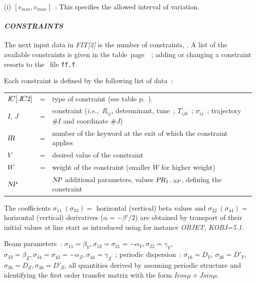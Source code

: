 \smallskip

\noindent (i) $[v_{min}, v_{max}]$~: This specifies the allowed interval of variation. 


\paragraph{\textit{CONSTRAINTS}}  

\noindent The next input data in \textsl{FIT[2]} is the number of constraints, \textsl{\NC}. 
A list of the available constraints is given in the table~page~\pageref{TabFITZlst1}~; adding or changing a constraint 
resorts to the \FORTRAN\ file \texttt{ff.f}. 

\medskip 

Each constraint is defined by the following list of data~: 

\begin{center}
	\begin{tabular}{lcp{15cm}}
	$I\!C[.I\!C 2]$        &  = &  type of  constraint (see table p.~\pageref{TabFITZlst1}).\\
	$I$, $J$    & =  &  constraint (\emph{i.e.},~$R_{ij}$, determinant, tune~; 
	                    $T_{ijk}$~; $\sigma_{ ij}$~; trajectory $\#I$ and coordinate $\#J$)\\
	\label{RefIR}
        $\textsl{IR}$       &  =  &  number of the keyword at the exit of which the constraint applies   \\
	$V$        &  =  &  desired value of the constraint\\
	$W$        &  =  &  weight of the constraint (smaller $W$ for higher weight)  \\
        $\textsl{NP}$       &    &   $\textsl{NP}$ additional parameters, values $\textsl{PR}_{1 - N\!P}$, defining the constraint  
	\end{tabular}
\end{center}



 The coefficients 
$ \sigma_{11}~(\sigma_{ 33}) = $ horizontal (vertical) beta values and 
$ \sigma_{ 22}~(\sigma_{ 44}) = $ horizontal (vertical) derivatives ($\alpha = -\beta'/2$) 
are obtained by transport of their initial values at line start as introduced using for instance  
\textsl{OBJET, KOBJ=5.1}.

\smallskip

 Beam parameters~: $\sigma_{11}=\beta_Y, \sigma_{12}=\sigma_{21}=-\alpha_Y, 
\sigma_{22}=\gamma_Y$, $\sigma_{33}=\beta_Z, \sigma_{34}=\sigma_{43}=-\alpha_Z, \sigma_{44}=\gamma_Z$~; periodic dispersion~: 
$\sigma_{16}=D_Y$, $\sigma_{26}=D'_Y$,  $\sigma_{36}=D_Z, \sigma_{46}=D'_Z$, all quantities derived by assuming 
 periodic structure and identifying the first order transfer matrix 
with the form   $I cos \mu + J sin \mu $. 

